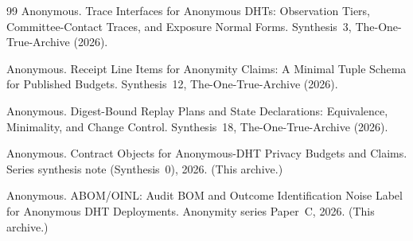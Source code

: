 \documentclass[11pt]{article}
\begin{document}
\begin{thebibliography}{99}
Anonymous.
\newblock Trace Interfaces for Anonymous DHTs: Observation Tiers, Committee-Contact Traces, and Exposure Normal Forms.
\newblock Synthesis~3, The-One-True-Archive (2026).

Anonymous.
\newblock Receipt Line Items for Anonymity Claims: A Minimal Tuple Schema for Published Budgets.
\newblock Synthesis~12, The-One-True-Archive (2026).

Anonymous.
\newblock Digest-Bound Replay Plans and State Declarations: Equivalence, Minimality, and Change Control.
\newblock Synthesis~18, The-One-True-Archive (2026).

Anonymous.
\newblock Contract Objects for Anonymous-DHT Privacy Budgets and Claims.
\newblock Series synthesis note (Synthesis~0), 2026. (This archive.)

Anonymous.
\newblock ABOM/OINL: Audit BOM and Outcome Identification Noise Label for Anonymous DHT Deployments.
\newblock Anonymity series Paper~C, 2026. (This archive.)

\end{thebibliography}
\end{document}
